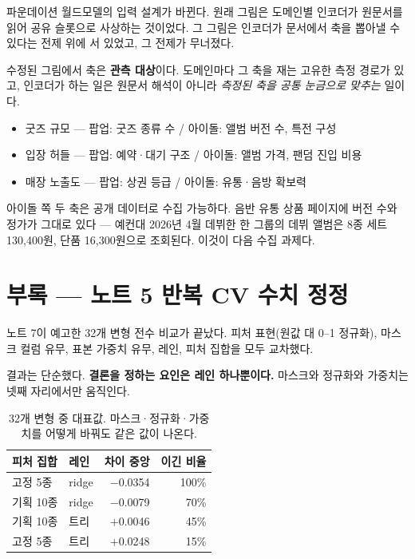 \documentclass[10pt]{article}
\begin{document}
파운데이션 월드모델의 입력 설계가 바뀐다. 원래 그림은 도메인별 인코더가 원문서를
읽어 공유 슬롯으로 사상하는 것이었다. 그 그림은 인코더가 문서에서 축을 뽑아낼 수
있다는 전제 위에 서 있었고, 그 전제가 무너졌다.

수정된 그림에서 축은 \textbf{관측 대상}이다. 도메인마다 그 축을 재는 고유한
측정 경로가 있고, 인코더가 하는 일은 원문서 해석이 아니라 \emph{측정된 축을 공통
눈금으로 맞추는} 일이다.

\begin{itemize}[leftmargin=1.1em,itemsep=0.15em]
\item 굿즈 규모 --- 팝업: 굿즈 종류 수 / 아이돌: 앨범 버전 수, 특전 구성
\item 입장 허들 --- 팝업: 예약·대기 구조 / 아이돌: 앨범 가격, 팬덤 진입 비용
\item 매장 노출도 --- 팝업: 상권 등급 / 아이돌: 유통·음방 확보력
\end{itemize}

아이돌 쪽 두 축은 공개 데이터로 수집 가능하다. 음반 유통 상품 페이지에 버전 수와
정가가 그대로 있다 --- 예컨대 2026년 4월 데뷔한 한 그룹의 데뷔 앨범은 8종 세트
130,400원, 단품 16,300원으로 조회된다. 이것이 다음 수집 과제다.

\section{부록 --- 노트 5 반복 CV 수치 정정}

노트 7이 예고한 32개 변형 전수 비교가 끝났다. 피처 표현(원값 대 0--1 정규화),
마스크 컬럼 유무, 표본 가중치 유무, 레인, 피처 집합을 모두 교차했다.

결과는 단순했다. \textbf{결론을 정하는 요인은 레인 하나뿐이다.} 마스크와 정규화와
가중치는 넷째 자리에서만 움직인다.

\begin{table}[t]
\centering\tsize
\caption{32개 변형 중 대표값. 마스크·정규화·가중치를 어떻게 바꿔도 같은 값이 나온다.}
\begin{tabular}{llrr}
\toprule
피처 집합 & 레인 & 차이 중앙 & 이긴 비율 \\
\midrule
고정 5종 & ridge & $-$0.0354 & 100\% \\
기획 10종 & ridge & $-$0.0079 & 70\% \\
기획 10종 & 트리 & $+$0.0046 & 45\% \\
고정 5종 & 트리 & $+$0.0248 & 15\% \\
\bottomrule
\end{tabular}
\end{table}
\end{document}
